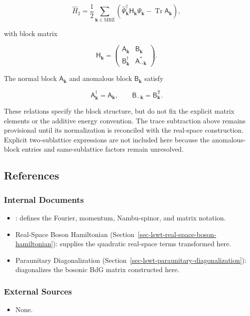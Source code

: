 \[
\hat H_2
=\frac12\sum_{\mathbf k\in\mathrm{MBZ}}
\left(
\hat\Psi_{\mathbf k}^\dagger\mathsf H_{\mathbf k}\hat\Psi_{\mathbf k}
-\operatorname{Tr}\mathsf A_{\mathbf k}
\right),
\]

with block matrix

\[
\mathsf H_{\mathbf k}
=\begin{pmatrix}
\mathsf A_{\mathbf k} & \mathsf B_{\mathbf k}\\
\mathsf B_{\mathbf k}^\dagger & \mathsf A_{-\mathbf k}^*
\end{pmatrix}.
\]

The normal block \(\mathsf A_{\mathbf k}\) and anomalous block \(\mathsf B_{\mathbf k}\) satisfy

\[
\mathsf A_{\mathbf k}^\dagger=\mathsf A_{\mathbf k},
\qquad
\mathsf B_{-\mathbf k}=\mathsf B_{\mathbf k}^{\mathsf T}.
\]

These relations specify the block structure, but do not fix the explicit matrix elements or the additive energy convention. The trace subtraction above remains provisional until its normalization is reconciled with the real-space construction. Explicit two-sublattice expressions are not included here because the anomalous-block entries and same-sublattice factors remain unresolved.

\subsection{References}

\subsubsection{Internal Documents}

\begin{itemize}
\tightlist
\item
  : defines the Fourier, momentum, Nambu-spinor, and matrix notation.
\item
  Real-Space Boson Hamiltonian (Section~\ref{sec-lswt-real-space-boson-hamiltonian}): supplies the quadratic real-space terms transformed here.
\item
  Paraunitary Diagonalization (Section~\ref{sec-lswt-paraunitary-diagonalization}): diagonalizes the bosonic BdG matrix constructed here.
\end{itemize}

\subsubsection{External Sources}

\begin{itemize}
\tightlist
\item
  None.
\end{itemize}
